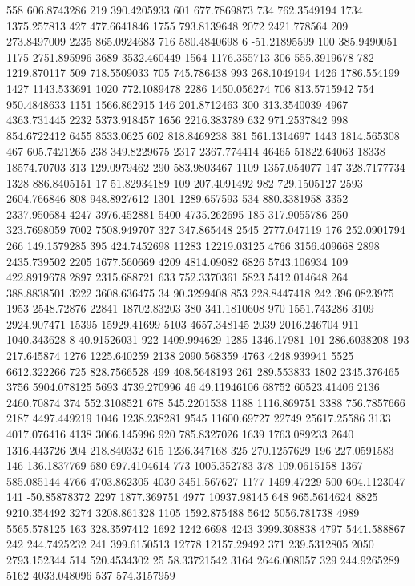 558	606.8743286
219	390.4205933
601	677.7869873
734	762.3549194
1734	1375.257813
427	477.6641846
1755	793.8139648
2072	2421.778564
209	273.8497009
2235	865.0924683
716	580.4840698
6	-51.21895599
100	385.9490051
1175	2751.895996
3689	3532.460449
1564	1176.355713
306	555.3919678
782	1219.870117
509	718.5509033
705	745.786438
993	268.1049194
1426	1786.554199
1427	1143.533691
1020	772.1089478
2286	1450.056274
706	813.5715942
754	950.4848633
1151	1566.862915
146	201.8712463
300	313.3540039
4967	4363.731445
2232	5373.918457
1656	2216.383789
632	971.2537842
998	854.6722412
6455	8533.0625
602	818.8469238
381	561.1314697
1443	1814.565308
467	605.7421265
238	349.8229675
2317	2367.774414
46465	51822.64063
18338	18574.70703
313	129.0979462
290	583.9803467
1109	1357.054077
147	328.7177734
1328	886.8405151
17	51.82934189
109	207.4091492
982	729.1505127
2593	2604.766846
808	948.8927612
1301	1289.657593
534	880.3381958
3352	2337.950684
4247	3976.452881
5400	4735.262695
185	317.9055786
250	323.7698059
7002	7508.949707
327	347.865448
2545	2777.047119
176	252.0901794
266	149.1579285
395	424.7452698
11283	12219.03125
4766	3156.409668
2898	2435.739502
2205	1677.560669
4209	4814.09082
6826	5743.106934
109	422.8919678
2897	2315.688721
633	752.3370361
5823	5412.014648
264	388.8838501
3222	3608.636475
34	90.3299408
853	228.8447418
242	396.0823975
1953	2548.72876
22841	18702.83203
380	341.1810608
970	1551.743286
3109	2924.907471
15395	15929.41699
5103	4657.348145
2039	2016.246704
911	1040.343628
8	40.91526031
922	1409.994629
1285	1346.17981
101	286.6038208
193	217.645874
1276	1225.640259
2138	2090.568359
4763	4248.939941
5525	6612.322266
725	828.7566528
499	408.5648193
261	289.553833
1802	2345.376465
3756	5904.078125
5693	4739.270996
46	49.11946106
68752	60523.41406
2136	2460.70874
374	552.3108521
678	545.2201538
1188	1116.869751
3388	756.7857666
2187	4497.449219
1046	1238.238281
9545	11600.69727
22749	25617.25586
3133	4017.076416
4138	3066.145996
920	785.8327026
1639	1763.089233
2640	1316.443726
204	218.840332
615	1236.347168
325	270.1257629
196	227.0591583
146	136.1837769
680	697.4104614
773	1005.352783
378	109.0615158
1367	585.085144
4766	4703.862305
4030	3451.567627
1177	1499.47229
500	604.1123047
141	-50.85878372
2297	1877.369751
4977	10937.98145
648	965.5614624
8825	9210.354492
3274	3208.861328
1105	1592.875488
5642	5056.781738
4989	5565.578125
163	328.3597412
1692	1242.6698
4243	3999.308838
4797	5441.588867
242	244.7425232
241	399.6150513
12778	12157.29492
371	239.5312805
2050	2793.152344
514	520.4534302
25	58.33721542
3164	2646.008057
329	244.9265289
5162	4033.048096
537	574.3157959

